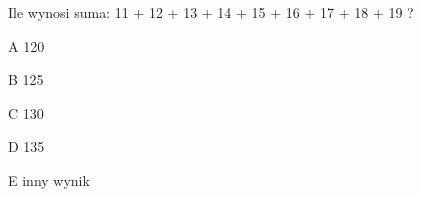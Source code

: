 \begin{tresc}
Ile wynosi suma: 11 + 12 + 13 + 14 + 15 + 16 + 17 + 18 + 19 ?
\end{tresc}
\begin{wariant}{A} 120 \end{wariant}
\begin{wariant}{B} 125 \end{wariant}
\begin{wariant}{C} 130 \end{wariant}
\begin{wariant}{D} 135 \end{wariant}
\begin{wariant}{E} inny wynik \end{wariant}
